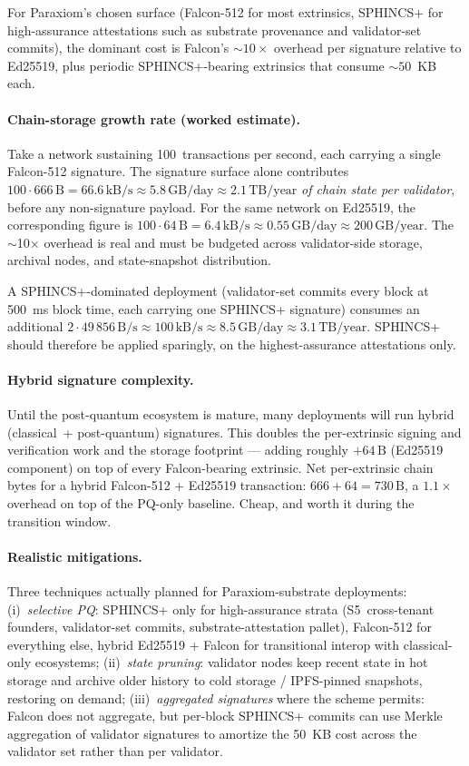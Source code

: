 \documentclass[11pt,a4paper,parskip=half-,DIV=12,headings=standardclasses]{scrartcl}
\theoremstyle{ncthm}
\theoremstyle{ncdef}
\begin{document}
For Paraxiom's chosen surface (Falcon-512 for most extrinsics,
SPHINCS+ for high-assurance attestations such as substrate provenance
and validator-set commits), the dominant cost is Falcon's
${\sim}10\times$ overhead per signature relative to Ed25519, plus
periodic SPHINCS+-bearing extrinsics that consume ${\sim}50$~KB each.

\paragraph{Chain-storage growth rate (worked estimate).} Take a
network sustaining 100~transactions per second, each carrying a single
Falcon-512 signature. The signature surface alone contributes
$100 \cdot 666\,\text{B} = 66.6\,\text{kB/s} \approx 5.8\,\text{GB/day}
\approx 2.1\,\text{TB/year}$ \emph{of chain state per validator}, before
any non-signature payload. For the same network on Ed25519, the
corresponding figure is $100 \cdot 64\,\text{B} = 6.4\,\text{kB/s}
\approx 0.55\,\text{GB/day} \approx 200\,\text{GB/year}$. The
$\sim$10$\times$ overhead is real and must be budgeted across
validator-side storage, archival nodes, and state-snapshot
distribution.

A SPHINCS+-dominated deployment (validator-set commits every block at
500~ms block time, each carrying one SPHINCS+ signature) consumes an
additional $2 \cdot 49\,856\,\text{B/s} \approx 100\,\text{kB/s} \approx
8.5\,\text{GB/day} \approx 3.1\,\text{TB/year}$. SPHINCS+ should
therefore be applied sparingly, on the highest-assurance
attestations only.

\paragraph{Hybrid signature complexity.} Until the post-quantum
ecosystem is mature, many deployments will run hybrid (classical~+
post-quantum) signatures. This doubles the per-extrinsic signing and
verification work and the storage footprint --- adding roughly
$+64\,\text{B}$ (Ed25519 component) on top of every Falcon-bearing
extrinsic. Net per-extrinsic chain bytes for a hybrid Falcon-512 +
Ed25519 transaction: $666 + 64 = 730\,\text{B}$, a $1.1\times$
overhead on top of the PQ-only baseline. Cheap, and worth it during
the transition window.

\paragraph{Realistic mitigations.} Three techniques actually planned
for Paraxiom-substrate deployments: (i)~\emph{selective PQ}: SPHINCS+
only for high-assurance strata
(S5~cross-tenant founders, validator-set commits, substrate-attestation
pallet), Falcon-512 for everything else, hybrid Ed25519 + Falcon for
transitional interop with classical-only ecosystems;
(ii)~\emph{state pruning}: validator nodes keep recent state in hot
storage and archive older history to cold storage / IPFS-pinned
snapshots, restoring on demand; (iii)~\emph{aggregated signatures}
where the scheme permits: Falcon does not aggregate, but per-block
SPHINCS+ commits can use Merkle aggregation of validator signatures to
amortize the 50~KB cost across the validator set rather than per
validator.
\end{document}
